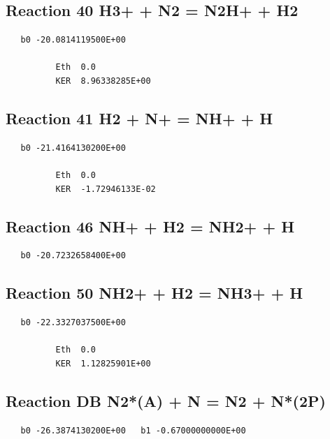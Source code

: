 \documentclass[12pt]{article}
\begin{document}
\subsection{
Reaction 40 H3+ + N2 = N2H+ + H2 }
\begin{small}\begin{verbatim}
   b0 -20.0814119500E+00

          Eth  0.0
          KER  8.96338285E+00

\end{verbatim}\end{small}
\newpage

\subsection{
Reaction 41 H2 + N+ = NH+ + H }
\begin{small}\begin{verbatim}
   b0 -21.4164130200E+00

          Eth  0.0
          KER  -1.72946133E-02

\end{verbatim}\end{small}
\newpage

\subsection{
Reaction 46 NH+ + H2 = NH2+ + H }
\begin{small}\begin{verbatim}
   b0 -20.7232658400E+00
\end{verbatim}\end{small}
\newpage

\subsection{
Reaction 50 NH2+ + H2 = NH3+ + H }
\begin{small}\begin{verbatim}
   b0 -22.3327037500E+00

          Eth  0.0
          KER  1.12825901E+00

\end{verbatim}\end{small}
\newpage

\subsection{
Reaction DB N2*(A) + N = N2 + N*(2P) }
\begin{small}\begin{verbatim}
   b0 -26.3874130200E+00   b1 -0.67000000000E+00
\end{verbatim}\end{small}
\newpage
\end{document}
